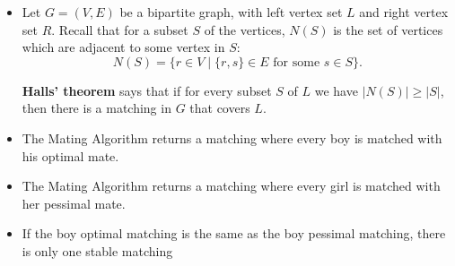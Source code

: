 \documentclass[11pt]{article}
\begin{document}
 \begin{itemize}
 \item Let $G=(V,E)$ be a bipartite graph, with left vertex set $L$ and right vertex set $R$.
Recall that for a subset $S$ of the vertices, $N(S)$ is the set of vertices which are adjacent to some vertex in $S$:
\[ N(S) = \{ r \in V \mid \{r, s\} \in E \text{ for some } s \in S \}. \]

\textbf{Halls' theorem} says that if for every subset $S$ of $L$ we have $|N(S)| \geq |S|$, then there is a matching in $G$ that covers $L$.
\item The Mating Algorithm returns a matching where every boy is matched with his optimal mate.
\item The Mating Algorithm returns a matching where every girl is matched with her pessimal mate.
\item If the boy optimal matching is the same as the boy pessimal matching, there is only one stable matching
\end{itemize}
\end{document}
